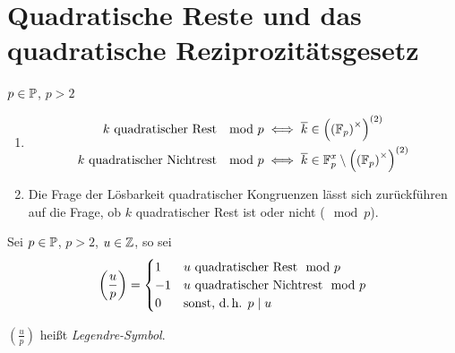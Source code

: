 \documentclass[a4paper,DIV15,BCOR12mm]{article}
\begin{document}
\section{Quadratische Reste und das quadratische Reziprozitätsgesetz}
$p\in\mathbb{P}$, $p>2$
\begin{definition}
\begin{enumerate}
\item \begin{align*}
    k \text{ quadratischer Rest } \mod p &      \iff \overline k \in \left(\left(\mathbb{F}_p\right)^{\times}\right)^{(2)} \\
    k \text{ quadratischer Nichtrest } \mod p & \iff \overline k \in \mathbb{F}_p^x \setminus \left(\left(\mathbb{F}_p\right)^{\times}\right)^{(2)} \\
    \end{align*}
\item Die Frage der Lösbarkeit quadratischer Kongruenzen lässt sich zurückführen auf die Frage, ob $k$ quadratischer Rest ist oder nicht ($\mod p$).
\end{enumerate}
\end{definition}

\begin{definition}
Sei $p \in \mathbb{P}$, $p>2$, $u \in \mathbb{Z}$, so sei
\[
\left(\frac{u}{p}\right) = \begin{cases}
    1  & u \text{ quadratischer Rest} \mod p\\
    -1 & u \text{ quadratischer Nichtrest} \mod p\\
    0  & \text{sonst, d.\,h. }p \mid u
    \end{cases}
\]

$\left(\frac{u}{p}\right)$ heißt \emph{Legendre-Symbol}.
\end{definition}
\end{document}

